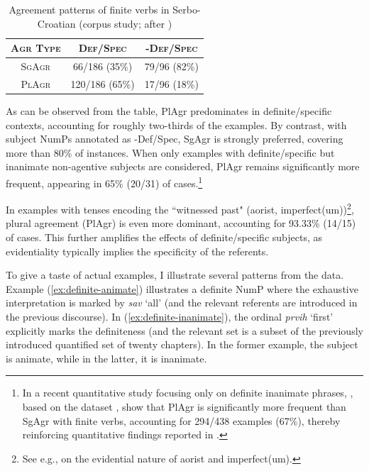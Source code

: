 \documentclass[output=paper,colorlinks,citecolor=brown
]{langscibook}
\begin{document}
\begin{table}[hbt!]
    \centering
    \caption{Agreement patterns of finite verbs in Serbo-Croatian (corpus study; after \citealt{Milosavljevic2017})}
    \label{tab:corpus-data-summary}
    \begin{tabular}{|c | c c |} 
        \hline
        \textsc{Agr Type} & \textsc{Def/Spec} & \textsc{-Def/Spec}  \\ [0.5ex] 
        \hline\hline
        \textsc{SgAgr}    & 66/186 (35\%)     & 79/96 (82\%)        \\ 
        \hline
        \textsc{PlAgr}    & 120/186 (65\%)    & 17/96 (18\%)        \\ 
        \hline
    \end{tabular}
\end{table}

\noindent As can be observed from the table, PlAgr predominates in definite/specific contexts, accounting for roughly two-thirds of the examples. By contrast, with subject NumPs annotated as -Def/Spec, SgAgr is strongly preferred, covering more than 80\% of instances. When only examples with definite/specific but inanimate non-agentive subjects are considered, PlAgr remains significantly more frequent, appearing in 65\% (20/31) of cases.\footnote{In a recent quantitative study focusing only on definite inanimate phrases, \citet{milosavljevic-stojkovic-2025genderedness}, based on the dataset \citet{milosavljevic-stojkovic2025-dataset}, show that PlAgr is significantly more frequent than SgAgr with finite verbs, accounting for 294/438 examples (67\%), thereby reinforcing quantitative findings reported in \citet{Milosavljevic2017}.}

In examples with tenses encoding the “witnessed past" (aorist, imperfect(um))\footnote{See e.g., \citet{samilov1957} on the evidential nature of aorist and imperfect(um).}, plural agreement (PlAgr) is even more dominant, accounting for 93.33\% (14/15) of cases. This further amplifies the effects of definite/specific subjects, as evidentiality typically implies the specificity of the referents.




To give a taste of actual examples, I illustrate several patterns from the data. 
Example (\ref{ex:definite-animate}) illustrates a definite NumP where the exhaustive interpretation is marked by \textit{sav} `all' (and the relevant referents are introduced in the previous discourse). In (\ref{ex:definite-inanimate}), the ordinal \textit{prvih} `first' explicitly marks the definiteness (and the relevant set is a subset of the previously introduced quantified set of twenty chapters). In the former example, the subject is animate, while in the latter, it is inanimate. 
\end{document}
